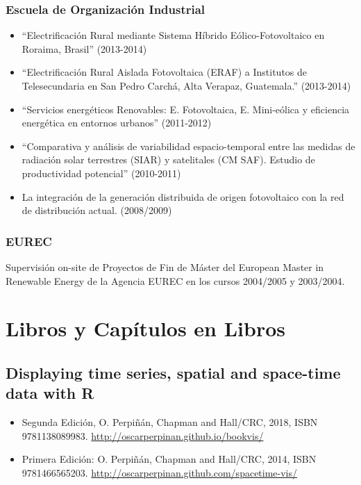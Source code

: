 \documentclass[article, a4paper]{memoir}
\begin{document}
\subsubsection{Escuela de Organización Industrial}
\label{sec:org4a695c6}
\begin{itemize}
\item ``Electrificación Rural mediante Sistema Híbrido Eólico-Fotovoltaico en Roraima, Brasil'' (2013-2014)
\item ``Electrificación Rural Aislada Fotovoltaica (ERAF) a Institutos de Telesecundaria en San Pedro Carchá, Alta Verapaz, Guatemala.'' (2013-2014)
\item ``Servicios energéticos Renovables: E. Fotovoltaica, E. Mini-eólica y eficiencia energética en entornos urbanos''     (2011-2012)

\item ``Comparativa y análisis de variabilidad espacio-temporal entre las medidas de radiación solar terrestres (SIAR) y satelitales (CM SAF). Estudio de productividad potencial'' (2010-2011)
\item \guillemotleft{}La integración de la generación distribuida de origen fotovoltaico con la red de distribución actual. (2008/2009)
\end{itemize}

\subsubsection{EUREC}
\label{sec:org2db6ae7}
Supervisión on-site de Proyectos de Fin de Máster del European Master in Renewable Energy de la Agencia EUREC en los cursos 2004/2005 y 2003/2004.

\section{Libros y Capítulos en Libros}
\label{sec:org123c183}
\subsection{Displaying time series, spatial and space-time data with R}
\label{sec:orgab586e4}
\begin{itemize}
\item Segunda Edición, O. Perpiñán, Chapman and Hall/CRC, 2018, ISBN 9781138089983. \url{http://oscarperpinan.github.io/bookvis/}
\item Primera Edición: O. Perpiñán, Chapman and Hall/CRC, 2014, ISBN 9781466565203. \url{http://oscarperpinan.github.com/spacetime-vis/}
\end{itemize}
\end{document}
